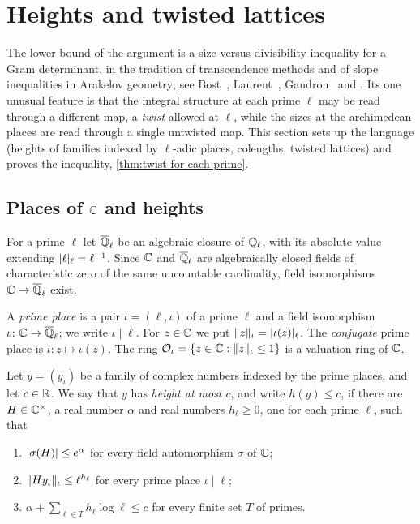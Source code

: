 \section{Heights and twisted lattices}\label{sec:lattices}

The lower bound of the argument is a size-versus-divisibility inequality for a Gram determinant, in
the tradition of transcendence methods and of slope inequalities in Arakelov geometry; see
Bost~\cite{Bost2001}, Laurent~\cite{Laurent1994}, Gaudron~\cite{Gaudron2008} and
\cite[Ch.~1]{BombieriGubler2006}. Its one unusual feature is that the integral structure at each
prime $\ell$ may be read through a different map, a \emph{twist} allowed at $\ell$, while the sizes at
the archimedean places are read through a single untwisted map. This section sets up the language
(heights of families indexed by $\ell$-adic places, colengths, twisted lattices) and proves the
inequality, \cref{thm:twist-for-each-prime}.

\subsection{Places of \texorpdfstring{$\mathbb{C}$}{C} and heights}\label{ss:heights}
For a prime $\ell$ let $\overline{\mathbb{Q}}_\ell$ be an algebraic closure of $\mathbb{Q}_\ell$, with its absolute value
extending $\lvert \ell\rvert_\ell=\ell^{-1}$. Since $\mathbb{C}$ and $\overline{\mathbb{Q}}_\ell$ are algebraically closed fields of
characteristic zero of the same uncountable cardinality, field isomorphisms $\mathbb{C}\to\overline{\mathbb{Q}}_\ell$ exist.

\begin{definition}\label{def:prime-iso}
A \emph{prime place} is a pair $\iota=(\ell,\iota)$ of a prime $\ell$ and a field isomorphism
$\iota\colon\mathbb{C}\to\overline{\mathbb{Q}}_\ell$; we write $\iota\mid\ell$. For $z\in\mathbb{C}$ we put $\lVert z\rVert_\iota=\lvert \iota(z)\rvert_\ell$.
The \emph{conjugate} prime place is $\bar\iota\colon z\mapsto\iota(\bar z)$. The ring
$\mathcal{O}_\iota=\{z\in\mathbb{C}:\lVert z\rVert_\iota\le1\}$ is a valuation ring of $\mathbb{C}$.
\end{definition}

\begin{definition}\label{def:height}
Let $y=(y_\iota)$ be a family of complex numbers indexed by the prime places, and let $c\in\mathbb{R}$. We
say that $y$ has \emph{height at most $c$}, and write $h(y)\le c$, if there are $H\in\mathbb{C}^\times$, a
real number $\alpha$ and real numbers $h_\ell\ge0$, one for each prime $\ell$, such that
\begin{enumerate}[label=\textup{(\roman*)}]
\item $\lvert \sigma(H)\rvert\le e^{\alpha}$ for every field automorphism $\sigma$ of $\mathbb{C}$;
\item $\lVert Hy_\iota\rVert_\iota\le\ell^{h_\ell}$ for every prime place $\iota\mid\ell$;
\item $\alpha+\sum_{\ell\in T}h_\ell\log\ell\le c$ for every finite set $T$ of primes.
\end{enumerate}
\end{definition}

